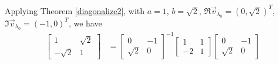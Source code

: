 \begin{exmp}
Applying Theorem \ref{diagonalize2}, with $a = 1$, $b = \sqrt{2}$, $\Re{\vec{v}_{\lambda_0}} = (0,\sqrt{2})^T$, $\Im{\vec{v}_{\lambda_0}} = (-1,0)^T$, we have
\begin{align*}
\begin{bmatrix}
1 & \sqrt{2} \\
-\sqrt{2} & 1
\end{bmatrix}
&= 
\begin{bmatrix}
0 & -1 \\
\sqrt{2} & 0
\end{bmatrix}^{-1}
\begin{bmatrix}
1 & 1 \\
-2 & 1
\end{bmatrix}
\begin{bmatrix}
0 & -1 \\
\sqrt{2} & 0
\end{bmatrix}
\end{align*}
\end{exmp}

